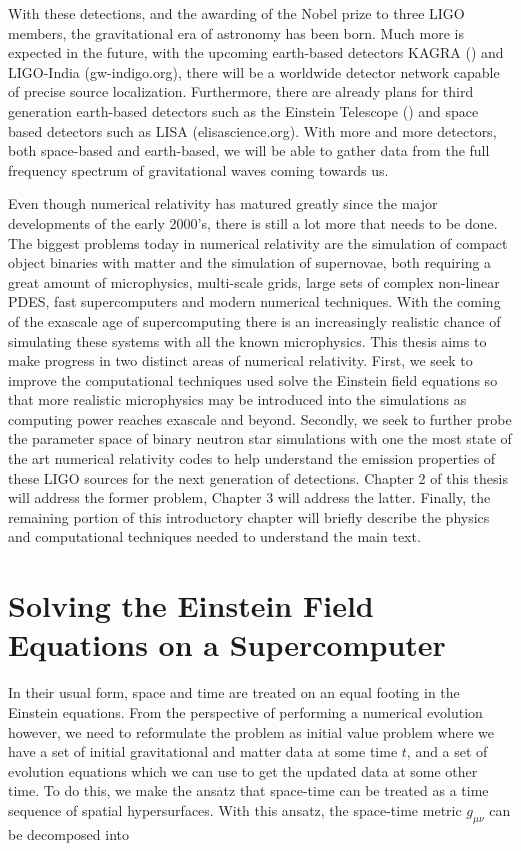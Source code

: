 With these detections, and the awarding of the Nobel prize to three LIGO members, the gravitational era of astronomy has been born. Much more is expected in the future, with the upcoming earth-based detectors KAGRA (\cite{somiya2012detector}) and LIGO-India (gw-indigo.org), there will be a worldwide detector network capable of precise source localization. Furthermore, there are already plans for third generation earth-based detectors such as the Einstein Telescope (\cite{einsteintelescope}) and space based detectors such as LISA (elisascience.org). With more and more detectors, both space-based and earth-based, we will be able to gather data from the full frequency spectrum of gravitational waves coming towards us.

Even though numerical relativity has matured greatly since the major developments of the early 2000's, there is still a lot more that needs to be done. The biggest problems today in numerical relativity are the simulation of compact object binaries with matter and the simulation of supernovae, both requiring a great amount of microphysics, multi-scale grids, large sets of complex non-linear PDES, fast supercomputers and modern numerical techniques. With the coming of the exascale age of supercomputing there is an increasingly realistic chance of simulating these systems with all the known microphysics. This thesis aims to make progress in two distinct areas of numerical relativity. First, we seek to improve the computational techniques used solve the Einstein field equations so that more realistic microphysics may be introduced into the simulations as computing power reaches exascale and beyond. Secondly, we seek to further probe the parameter space of binary neutron star simulations with one the most state of the art numerical relativity codes to help understand the emission properties of these LIGO sources for the next generation of detections. Chapter 2 of this thesis will address the former problem, Chapter 3 will address the latter. Finally, the remaining portion of this introductory chapter will briefly describe the physics and computational techniques needed to understand the main text. 

\section{Solving the Einstein Field Equations on a Supercomputer}

In their usual form, space and time are treated on an equal footing in the Einstein equations. From the perspective of performing a numerical evolution however, we need to reformulate the problem as initial value problem where we have a set of initial gravitational and matter data at some time $t$, and a set of evolution equations which we can use to get the updated data at some other time. To do this, we make the ansatz that space-time can be treated as a time sequence of spatial hypersurfaces. With this ansatz, the space-time metric $g_{\mu\nu}$ can be decomposed into

